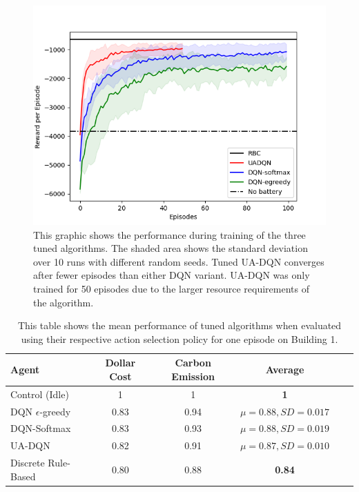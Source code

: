 \begin{figure}
  \centering
  \includegraphics[width=\figurewidth]{figures/tuning_validation.png}
  \caption{This graphic shows the performance during training of the three tuned algorithms. The shaded area shows the standard deviation over 10 runs with different random seeds. Tuned UA-DQN converges after fewer episodes than either DQN variant. UA-DQN was only trained for 50 episodes due to the larger resource requirements of the algorithm.}
  \label{fig:tuning_validation}
\end{figure}

\begin{table}
  \centering
  \caption{This table shows the mean performance of tuned algorithms when evaluated using their respective action selection policy for one episode on Building 1.}
  \label{tab:tuned_results}
  \begin{tabular}{l|ccccc}
    Agent                 & Dollar Cost & Carbon Emission & Average \\ \hline
    Control (Idle)   & 1    & 1    & \textbf{1}    \\
    DQN $\epsilon$-greedy & 0.83 & 0.94 & $\mu = \mathbf{0.88}, SD = 0.017$ \\
    DQN-Softmax           & 0.83 & 0.93 & $\mu = \mathbf{0.88}, SD = 0.019$ \\
    UA-DQN                & 0.82 & 0.91 & $\mu = \mathbf{0.87}, SD = 0.010$ \\
    Discrete Rule-Based   & 0.80 & 0.88 & \textbf{0.84}
  \end{tabular}
\end{table}
